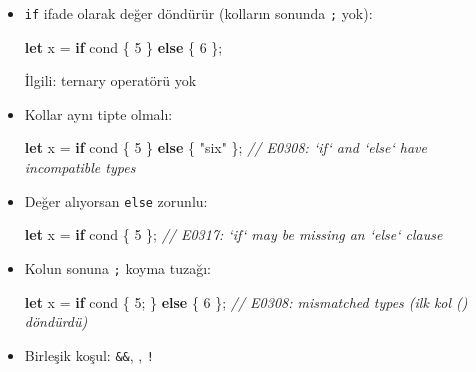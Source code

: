 \documentclass[12pt,a4paper]{article}
\newenvironment{Shaded}{}{}
\newcommand{\CommentTok}[1]{\textcolor[rgb]{0.38,0.63,0.69}{\textit{#1}}}
\newcommand{\ControlFlowTok}[1]{\textcolor[rgb]{0.00,0.44,0.13}{\textbf{#1}}}
\newcommand{\DecValTok}[1]{\textcolor[rgb]{0.25,0.63,0.44}{#1}}
\newcommand{\KeywordTok}[1]{\textcolor[rgb]{0.00,0.44,0.13}{\textbf{#1}}}
\newcommand{\NormalTok}[1]{#1}
\newcommand{\OperatorTok}[1]{\textcolor[rgb]{0.40,0.40,0.40}{#1}}
\newcommand{\StringTok}[1]{\textcolor[rgb]{0.25,0.44,0.63}{#1}}
\begin{document}
\begin{itemize}
\begin{Shaded}
\begin{Highlighting}[]
\ControlFlowTok{if} \OperatorTok{(}\NormalTok{n }\OperatorTok{\textgreater{}} \DecValTok{5}\OperatorTok{)} \OperatorTok{\{} \OperatorTok{\}}   \CommentTok{// warning: unnecessary parentheses}
\ControlFlowTok{if}\NormalTok{ n }\OperatorTok{\textgreater{}} \DecValTok{5}\NormalTok{ println}\OperatorTok{!(}\StringTok{"x"}\OperatorTok{);}   \CommentTok{// error: expected `\{`, found `println`}
\end{Highlighting}
\end{Shaded}
\item
  \texttt{if} ifade olarak değer döndürür (kolların sonunda \texttt{;} yok):

\begin{Shaded}
\begin{Highlighting}[]
\KeywordTok{let}\NormalTok{ x }\OperatorTok{=} \ControlFlowTok{if}\NormalTok{ cond }\OperatorTok{\{} \DecValTok{5} \OperatorTok{\}} \ControlFlowTok{else} \OperatorTok{\{} \DecValTok{6} \OperatorTok{\};}
\end{Highlighting}
\end{Shaded}


  İlgili: ternary operatörü yok
\item
  Kollar aynı tipte olmalı:

\begin{Shaded}
\begin{Highlighting}[]
\KeywordTok{let}\NormalTok{ x }\OperatorTok{=} \ControlFlowTok{if}\NormalTok{ cond }\OperatorTok{\{} \DecValTok{5} \OperatorTok{\}} \ControlFlowTok{else} \OperatorTok{\{} \StringTok{"six"} \OperatorTok{\};}
\CommentTok{// E0308: `if` and `else` have incompatible types}
\end{Highlighting}
\end{Shaded}
\item
  Değer alıyorsan \texttt{else} zorunlu:

\begin{Shaded}
\begin{Highlighting}[]
\KeywordTok{let}\NormalTok{ x }\OperatorTok{=} \ControlFlowTok{if}\NormalTok{ cond }\OperatorTok{\{} \DecValTok{5} \OperatorTok{\};}
\CommentTok{// E0317: `if` may be missing an `else` clause}
\end{Highlighting}
\end{Shaded}
\item
  Kolun sonuna \texttt{;} koyma tuzağı:

\begin{Shaded}
\begin{Highlighting}[]
\KeywordTok{let}\NormalTok{ x }\OperatorTok{=} \ControlFlowTok{if}\NormalTok{ cond }\OperatorTok{\{} \DecValTok{5}\OperatorTok{;} \OperatorTok{\}} \ControlFlowTok{else} \OperatorTok{\{} \DecValTok{6} \OperatorTok{\};}
\CommentTok{// E0308: mismatched types (ilk kol () döndürdü)}
\end{Highlighting}
\end{Shaded}
\item
  Birleşik koşul: \texttt{\&\&}, \texttt{\textbar{}\textbar{}}, \texttt{!}


\end{itemize}
\end{document}
